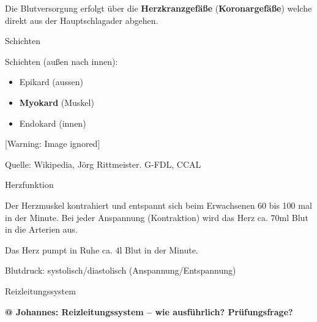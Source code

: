 \documentclass{article}
\makeatletter
\newcommand\gEs[1]{\textbf{\textcolor[rgb]{0.0,0.0,0.5019608}{#1}}}
\newcommand\gEs[1]{\textbf{\textcolor[rgb]{0.0,0.0,0.5019608}{#1}}}
\newcommand\gT[1]{\textbf{\textup{\textcolor[rgb]{0.0,0.5019608,0.0}{#1}}}}
\newcommand\captionof[1]{\def\@captype{#1}\caption}
\makeatother
\begin{document}
{\mdseries
Die Blutversorgung erfolgt \"uber die
\gEs{Herzkranzgef\"a{\ss}e}
(\gT{Koronargef\"a{\ss}e}) welche direkt aus der
Hauptschlagader abgehen. }

{\mdseries\color{black}
Schichten}

{ Schichten (au{\ss}en nach innen):}

\begin{itemize}
\item {\mdseries
Epikard (aussen)}

\item {\mdseries
\gEs{Myokard} (Muskel)}

\item {\mdseries
Endokard (innen)}

\end{itemize}
\begin{minipage}{13.6cm}
 [Warning: Image ignored] %
\captionof{figure}[Schema der Herz-Anatomie. ]{Schema der Herz-Anatomie.
}
{\mdseries\upshape
Quelle: Wikipedia,  J\"org Rittmeister. G-FDL, CCAL}

\end{minipage}

{\mdseries\color{black}
Herzfunktion}

{\mdseries
Der Herzmuskel kontrahiert und entspannt sich beim Erwachsenen 60 bis
100 mal in der Minute. Bei jeder Anspannung (Kontraktion) wird das Herz
ca. 70ml Blut in die Arterien aus. }

{\mdseries
Das Herz pumpt in Ruhe ca. 4l Blut in der Minute. }

{\mdseries
Blutdruck: systolisch/diastolisch  (Anspannung/Entspannung)}

{\mdseries\color[rgb]{0.0,0.0,0.5019608}
%
%
Reizleitungssystem}

{\bfseries\color[rgb]{0.5019608,0.0,0.0}
@ Johannes: Reizleitungssystem -- wie ausf\"uhrlich? Pr\"ufungsfrage?}
\end{document}
